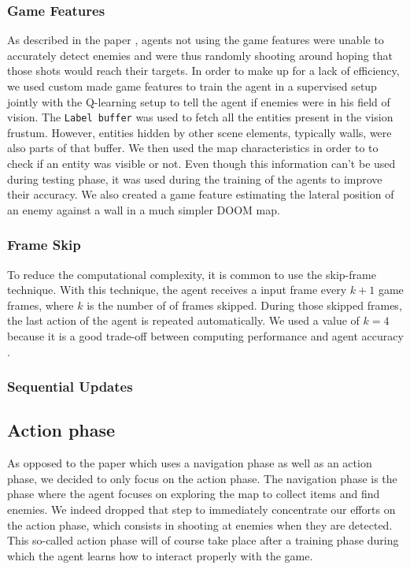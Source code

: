 \documentclass[letterpaper]{article}
\begin{document}
\subsubsection{Game Features}
As described in the paper \citep{Lample2016}, agents not using the game
features were unable to accurately detect enemies and were thus randomly
shooting around hoping that those shots would reach their targets. In order
to make up for a lack of efficiency, we used custom made game features to train the
agent in a supervised setup jointly with the Q-learning setup to tell the
agent if enemies were in his field of
vision. The \texttt{Label buffer} 
was used to fetch all the entities present
in the vision frustum. However, entities hidden by other scene elements,
typically walls, were also parts of that buffer. We then used the map
characteristics in order to to check if an entity was visible or not. Even
though this information can't be used during testing phase, it was used
during the training of the agents to improve their accuracy.
We also created a game feature estimating the lateral position of an enemy
against a wall in a much simpler DOOM map.

\subsubsection{Frame Skip}
To reduce the computational complexity, it is common to use the skip-frame
technique. With this technique, the agent receives a input frame every $k + 1$
game frames, where $k$ is the number of of frames skipped. During those
skipped frames, the last action of the agent is repeated automatically.
We used a value of $k=4$ because it is a good trade-off between
computing performance and agent accuracy \citep{Kempka2016}.


\subsubsection{Sequential Updates}


\subsection{Action phase}
As opposed to the paper \citep{Lample2016} which uses a navigation phase as
well as an action phase, we decided to only focus on the action phase. The
navigation phase is the phase where the agent focuses on exploring the map to
collect items and find enemies. We indeed dropped that step to immediately
concentrate our efforts on the action phase, which consists in shooting at
enemies when they are detected. This so-called action phase will of course
take place after a training phase during which the agent learns how to interact
properly with the game.
\end{document}
